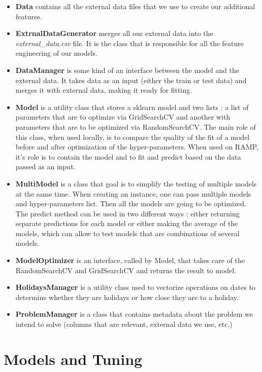 \documentclass[a4paper,12pt,twoside]{article}
\begin{document}
\begin{itemize}
	\item \textbf{Data} contains all the external data files that we use to create our additional features.
	\item \textbf{ExtrnalDataGenerator} merges all our external data into the \textit{external\_data.csv} file. It is the class that is responsible for all the feature engineering of our models.
	\item \textbf{DataManager} is some kind of an interface between the model and the external data. It takes data as an input (either the train or test data) and merges it with external data, making it ready for fitting.
	\item \textbf{Model} is a utility class that stores a sklearn model and two lists : a list of parameters that are to optimize via GridSearchCV and another with parameters that are to be optimized via RandomSearchCV. The main role of this class, when used locally, is to compare the quality of the fit of a model before and after optimization of the hyper-parameters. When used on RAMP, it's role is to contain the model and to fit and predict based on the data passed as an input.
	\item \textbf{MultiModel} is a class that goal is to simplify the testing of multiple models at the same time. When creating an instance, one can pass multiple models and hyper-parameters list. Then all the models are going to be optimized. The predict method can be used in two different ways : either returning separate predictions for each model or either making the average of the models, which can allow to test models that are combinations of several models.
	\item \textbf{ModelOptimizer} is an interface, called by Model, that takes care of the RandomSearchCV and GridSearchCV and returns the result to model.
	\item \textbf{HolidaysManager} is a utility class used to vectorize operations on dates to determine whether they are holidays or how close they are to a holiday.
	\item \textbf{ProblemManager} is a class that contains metadata about the problem we intend to solve (columns that are relevant, external data we use, etc.)
\end{itemize}

\section{Models and Tuning}
\end{document}
